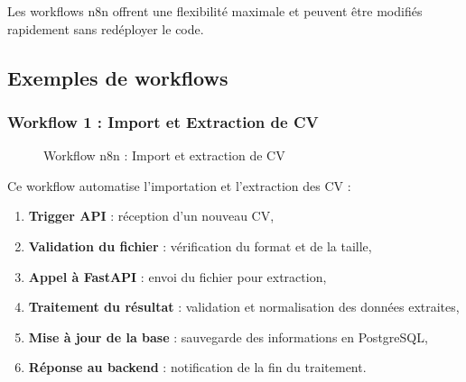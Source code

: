 Les workflows n8n offrent une flexibilité maximale et peuvent être modifiés rapidement sans redéployer le code.


\subsection{Exemples de workflows}
\label{subsec:exemples-workflows}

\subsubsection{Workflow 1 : Import et Extraction de CV}
\label{subsubsec:workflow1-import-extraction}

\begin{figure}[!ht]
    \centering
    \caption{Workflow n8n : Import et extraction de CV}
    \label{fig:workflow-import-cv}
\end{figure}

Ce workflow automatise l'importation et l'extraction des CV :

\begin{enumerate}
    \item \textbf{Trigger API} : réception d'un nouveau CV,
    \item \textbf{Validation du fichier} : vérification du format et de la taille,
    \item \textbf{Appel à FastAPI} : envoi du fichier pour extraction,
    \item \textbf{Traitement du résultat} : validation et normalisation des données extraites,
    \item \textbf{Mise à jour de la base} : sauvegarde des informations en PostgreSQL,
    \item \textbf{Réponse au backend} : notification de la fin du traitement.
\end{enumerate}


